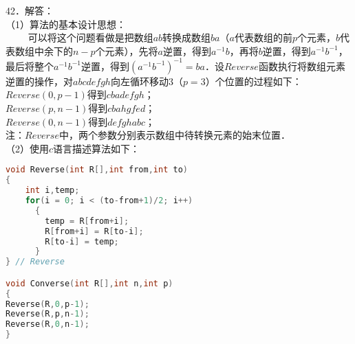 42．解答：\\
（1）算法的基本设计思想：\\
$\qquad$ 可以将这个问题看做是把数组$ab$转换成数组$ba$（$a$代表数组的前$p$个元素，$b$代表数组中余下的$n-p$个元素），先将$a$逆置，得到$a^{-1}b$，再将$b$逆置，得到$a^{-1}b^{-1}$，最后将整个$a^{-1}b^{-1}$逆置，得到$(a^{-1}b^{-1})^{-1}=ba$．设$Reverse$函数执行将数组元素逆置的操作，对$abcdefgh$向左循环移动$3$（$p=3$）个位置的过程如下：\\
$Reverse(0,p-1)$得到$cbadefgh$； \\
$Reverse(p,n-1)$得到$cbahgfed$； \\
$Reverse(0,n-1)$得到$defghabc$； \\
注：$Reverse$中，两个参数分别表示数组中待转换元素的始末位置． \\
（2）使用$c$语言描述算法如下：
\begin{lstlisting}[language=cpp]
void Reverse(int R[],int from,int to)
{
    int i,temp;
    for(i = 0; i < (to-from+1)/2; i++)
      {
        temp = R[from+i];
        R[from+i] = R[to-i];
        R[to-i] = temp;
      }
} // Reverse

void Converse(int R[],int n,int p)
{
Reverse(R,0,p-1);
Reverse(R,p,n-1);
Reverse(R,0,n-1);
}
\end{lstlisting}




